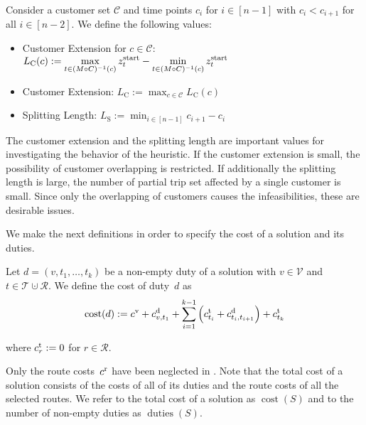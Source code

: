 \begin{definition}

Consider a customer set $\mathcal{C}$ and time points $c_i$ for $i\in[n-1]$ with $c_i<c_{i+1}$ for all $i\in[n-2]$. We define the following values:
\begin{itemize}
	\item{Customer Extension for $c\in\mathcal{C}$: $\displaystyle{L_{\operatorname{C}}(c) := \max_{t\in(M\circ C)^{-1}(c)}z^{\operatorname{start}}_t - \min_{t\in(M\circ C)^{-1}(c)}z^{\operatorname{start}}_t}$}
	\item{Customer Extension: $\displaystyle{L_{\operatorname{C}} := \max_{c\in\mathcal{C}} L_{\operatorname{C}}(c)}$}
	\item{Splitting Length: $\displaystyle{L_{\operatorname{S}} := \min_{i\in[n-1]} c_{i+1}-c_i}$}
\end{itemize}

\end{definition}

The customer extension and the splitting length are important values for investigating the behavior of the heuristic. If the customer extension is small, the possibility of customer overlapping is restricted. If additionally the splitting length is large, the number of partial trip set affected by a single customer is small. Since only the overlapping of customers causes the infeasibilities, these are  desirable issues.

We make the next definitions in order to specify the cost of a solution and its duties.

\begin{definition}
\label{def:dutycost}

Let ${d=\left(v,t_1,\dots,t_k\right)}$ be a non-empty duty of a solution with ${v\in\mathcal{V}}$ and ${t\in\mathcal{T}\cupdot\mathcal{R}}$. We define the cost of duty~$d$ as
\begin{align*}
	\operatorname{cost}(d) := c^{\operatorname{v}} + c^{\operatorname{d}}_{v,t_1} + \sum_{i=1}^{k-1} \left(c^{\operatorname{t}}_{t_i} + c^{\operatorname{d}}_{t_i, t_{i+1}}\right) + c^{\operatorname{t}}_{t_k}
\end{align*}

where $c^{\operatorname{t}}_r := 0$ for $r\in\mathcal{R}$.

\end{definition}

Only the route costs~$c^{\operatorname{r}}$ have been neglected in . Note that the total cost of a solution consists of the costs of all of its duties and the route costs of all the selected routes. We refer to the total cost of a solution as $\operatorname{cost}\left(S\right)$ and to the number of non-empty duties as $\operatorname{duties}\left(S\right)$. 

